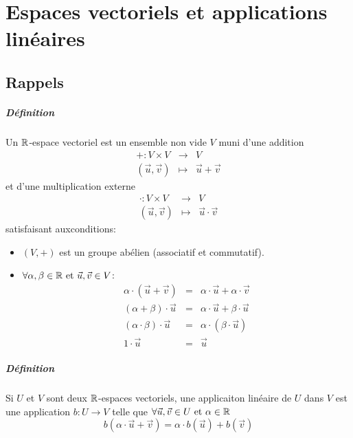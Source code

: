 \chapter{Espaces vectoriels et applications linéaires}

%
%
\section{Rappels}
%
%
\paragraph{Définition} Un $\mathbb{R}$-espace vectoriel est un ensemble non vide $V$ muni d'une addition
\begin{eqnarray*}
  +: V \times V &\rightarrow& V \\
  (\vec{u}, \vec{v}) &\mapsto& \vec{u} + \vec{v}
\end{eqnarray*}
et d'une multiplication externe
\begin{eqnarray*}
  \cdot: V \times V &\rightarrow& V \\
  (\vec{u}, \vec{v}) &\mapsto& \vec{u} \cdot \vec{v}
\end{eqnarray*}
satisfaisant auxconditions:
\begin{itemize}
  \item $(V, +)$ est un groupe abélien (associatif et commutatif).
  \item $\forall \alpha, \beta \in \mathbb{R} \text{ et } \vec{u}, \vec{v} \in V$:
    \begin{eqnarray*}
      \alpha \cdot (\vec{u} + \vec{v}) &=& \alpha \cdot \vec{u} + \alpha \cdot \vec{v} \\
      (\alpha + \beta) \cdot \vec{u} &=& \alpha \cdot \vec{u} + \beta \cdot \vec{u} \\
      (\alpha \cdot \beta)\cdot \vec{u} &=& \alpha \cdot (\beta \cdot \vec{u}) \\
      1 \cdot \vec{u} &=& \vec{u}
    \end{eqnarray*}
\end{itemize}

\paragraph{Définition} Si $U$ et $V$ sont deux $\mathbb{R}$-espaces vectoriels, une applicaiton linéaire de $U$ dans $V$ est une application $b: U \rightarrow V$ telle que $\forall \vec{u}, \vec{v} \in U \text{ et } \alpha \in \mathbb{R}$
$$b(\alpha \cdot \vec{u} + \vec{v}) = \alpha \cdot b(\vec{u}) + b(\vec{v})$$

